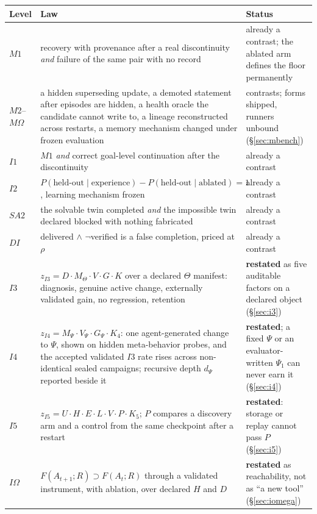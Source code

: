\begin{table}[!htbp]
\centering\small
\begin{tabularx}{\textwidth}{@{}>{\raggedright\arraybackslash}p{1.1cm}>{\raggedright\arraybackslash}p{6.2cm}Y@{}}
\toprule
Level & Law & Status \\
\midrule
$M1$ & recovery with provenance after a real discontinuity \emph{and} failure of the same pair with no record & already a contrast; the ablated arm defines the floor permanently \\
$M2$--$M\Omega$ & a hidden superseding update, a demoted statement after episodes are hidden, a health oracle the candidate cannot write to, a lineage reconstructed across restarts, a memory mechanism changed under frozen evaluation & contrasts; forms shipped, runners unbound (\S\ref{sec:mbench}) \\
$I1$ & $M1$ \emph{and} correct goal-level continuation after the discontinuity & already a contrast \\
$I2$ & $P(\text{held-out} \mid \text{experience}) - P(\text{held-out} \mid \text{ablated}) = 1$, learning mechanism frozen & already a contrast \\
$SA2$ & the solvable twin completed \emph{and} the impossible twin declared blocked with nothing fabricated & already a contrast \\
$DI$ & delivered $\wedge$ $\neg$verified is a false completion, priced at $\rho$ & already a contrast \\
$I3$ & $z_{I3} = D \cdot M_\Theta \cdot V \cdot G \cdot K$ over a declared $\Theta$ manifest: diagnosis, genuine active change, externally validated gain, no regression, retention & \textbf{restated} as five auditable factors on a declared object (\S\ref{sec:i3}) \\
$I4$ & $z_{I4} = M_\Psi \cdot V_\Psi \cdot G_\Psi \cdot K_4$: one agent-generated change to $\Psi$, shown on hidden meta-behavior probes, and the accepted validated $I3$ rate rises across non-identical sealed campaigns; recursive depth $d_\Psi$ reported beside it & \textbf{restated}; a fixed $\Psi$ or an evaluator-written $\Psi_1$ can never earn it (\S\ref{sec:i4}) \\
$I5$ & $z_{I5} = U \cdot H \cdot E \cdot L \cdot V \cdot P \cdot K_5$; $P$ compares a discovery arm and a control from the same checkpoint after a restart & \textbf{restated}: storage or replay cannot pass $P$ (\S\ref{sec:i5}) \\
$I\Omega$ & $F(A_{t+1}; R) \supset F(A_t; R)$ through a validated instrument, with ablation, over declared $H$ and $D$ & \textbf{restated} as reachability, not as ``a new tool'' (\S\ref{sec:iomega}) \\

\end{tabularx}
\end{table}
